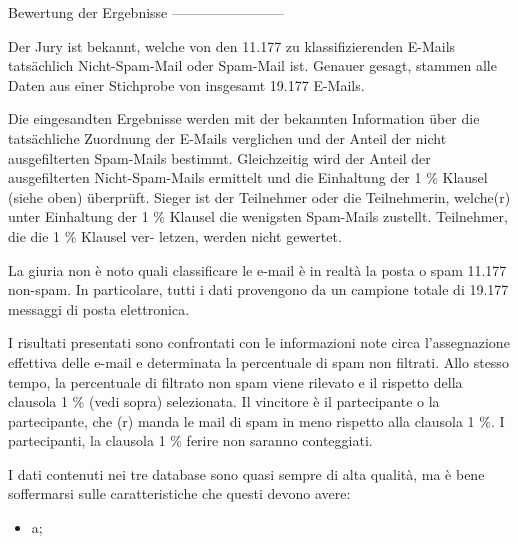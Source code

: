 Bewertung der Ergebnisse
------------------------

Der Jury ist bekannt, welche von den 11.177 zu klassifizierenden
E-Mails tatsächlich Nicht-Spam-Mail oder Spam-Mail ist. Genauer
gesagt, stammen alle Daten aus einer Stichprobe von insgesamt
19.177 E-Mails.

Die eingesandten Ergebnisse werden mit der bekannten Information über
die tatsächliche Zuordnung der E-Mails verglichen und der Anteil der
nicht ausgefilterten Spam-Mails bestimmt. Gleichzeitig wird der Anteil
der ausgefilterten Nicht-Spam-Mails ermittelt und die Einhaltung
der 1 \% Klausel (siehe oben) überprüft. Sieger ist der Teilnehmer
oder die Teilnehmerin, welche(r) unter Einhaltung der 1 \% Klausel die
wenigsten Spam-Mails zustellt. Teilnehmer, die die 1 \% Klausel ver-
letzen, werden nicht gewertet.

La giuria non è noto quali classificare le e-mail è in realtà la posta o spam 11.177 non-spam. In particolare, tutti i dati provengono da un campione totale di 19.177 messaggi di posta elettronica.

I risultati presentati sono confrontati con le informazioni note circa l'assegnazione effettiva delle e-mail e determinata la percentuale di spam non filtrati. Allo stesso tempo, la percentuale di filtrato non spam viene rilevato e il rispetto della clausola 1 \% (vedi sopra) selezionata. Il vincitore è il partecipante o la partecipante, che (r) manda le mail di spam in meno rispetto alla clausola 1 \%. I partecipanti, la clausola 1 \% ferire non saranno conteggiati.


I dati contenuti nei tre database sono quasi sempre di alta qualità, ma è bene soffermarsi sulle caratteristiche che questi devono avere:
\begin{itemize}
	\item a;
\end{itemize}

